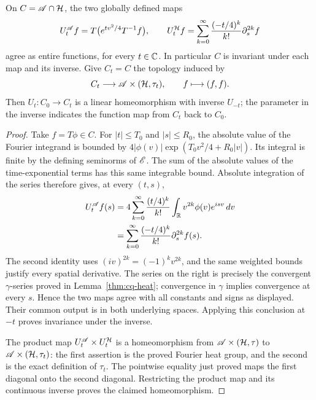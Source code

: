 \begin{theorem}
\label{ccb:common-heat}
On $C=\mathscr A\cap\mathcal H$, the two globally defined maps
\[
 U_t^{\mathscr A}f=T\bigl(e^{tv^2/4}T^{-1}f\bigr),\qquad
 U_t^{\mathcal H}f=\sum_{k=0}^{\infty}
              \frac{(-t/4)^k}{k!}\partial_s^{2k}f
\]
agree as entire functions, for every $t\in\mathbb C$. In particular $C$
is invariant under each map and its inverse. Give $C_t=C$ the
topology induced by
\[
 C_t\longrightarrow\mathscr A\times(\mathcal H,\tau_t),\qquad f\longmapsto(f,f).
\]
Then $U_t:C_0\longrightarrow C_t$ is a linear homeomorphism with
inverse $U_{-t}$; the parameter in the inverse indicates the function
map from $C_t$ back to $C_0$.
\end{theorem}
\begin{proof}
Take $f=T\phi\in C$. For $|t|\leq T_0$ and $|s|\leq R_0$,
the absolute value of the Fourier integrand is bounded by
$4|\phi(v)|\exp(T_0v^2/4+R_0|v|)$. Its integral is finite by
the defining seminorms of $\mathscr E$. The sum of the absolute values of
the time-exponential terms has this same integrable bound. Absolute
integration of the series therefore gives, at every $(t,s)$,
\begin{align*}
 U_t^{\mathscr A}f(s)
 &=4\sum_{k=0}^{\infty}\frac{(t/4)^k}{k!}
                   \int_{\mathbb R}v^{2k}\phi(v)e^{isv}\,dv\\
 &=\sum_{k=0}^{\infty}\frac{(-t/4)^k}{k!}\partial_s^{2k}f(s).
\end{align*}
The second identity uses $(iv)^{2k}=(-1)^kv^{2k}$, and the
same weighted bounds justify every spatial derivative. The series
on the right is precisely the convergent $\gamma$-series proved in
Lemma~\ref{thm:cq-heat}; convergence in $\gamma$ implies convergence
at every $s$. Hence the two maps agree with all constants and signs
as displayed. Their common output is in both underlying spaces.
Applying this conclusion at $-t$ proves invariance under the inverse.

The product map $U_t^{\mathscr A}\times U_t^{\mathcal H}$ is a
homeomorphism from $\mathscr A\times(\mathcal H,\tau)$ to
$\mathscr A\times(\mathcal H,\tau_t)$: the first assertion is the proved
Fourier heat group, and the second is the exact definition of
$\tau_t$. The pointwise equality just proved maps the first
diagonal onto the second diagonal. Restricting the product map and
its continuous inverse proves the claimed homeomorphism.
\end{proof}


